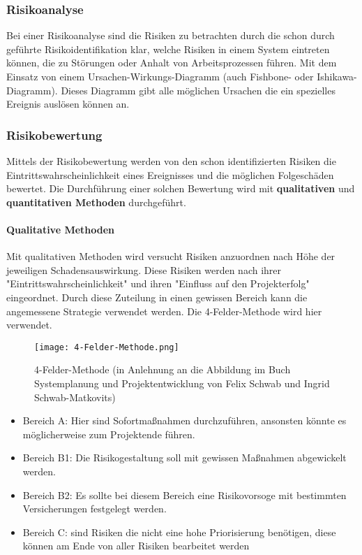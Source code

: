 \subsubsection{Risikoanalyse}
Bei einer Risikoanalyse sind die Risiken zu betrachten durch die schon durch geführte Risikoidentifikation klar, welche Risiken in einem System eintreten können, die zu Störungen oder Anhalt von Arbeitsprozessen führen. Mit dem Einsatz von einem Ursachen-Wirkungs-Diagramm (auch Fishbone- oder Ishikawa-Diagramm). Dieses Diagramm gibt alle möglichen Ursachen die ein spezielles Ereignis auslösen können an.

\subsubsection{Risikobewertung}
Mittels der Risikobewertung werden von den schon identifizierten Risiken die Eintrittswahrscheinlichkeit eines Ereignisses und die möglichen Folgeschäden bewertet. Die Durchführung einer solchen Bewertung wird mit \textbf{qualitativen} und \textbf{quantitativen Methoden} durchgeführt.

\paragraph{Qualitative Methoden}
Mit qualitativen Methoden wird versucht Risiken anzuordnen nach Höhe der jeweiligen Schadensauswirkung.
Diese Risiken werden nach ihrer "Eintrittswahrscheinlichkeit" und ihren "Einfluss auf den Projekterfolg" eingeordnet. Durch diese Zuteilung in einen gewissen Bereich kann die angemessene Strategie verwendet werden. Die 4-Felder-Methode wird hier verwendet.

\begin{center}
\begin{figure}[h]
    \centering
    \texttt{[image: 4-Felder-Methode.png]}
    \caption{4-Felder-Methode (in Anlehnung an die Abbildung im Buch Systemplanung und Projektentwicklung von Felix Schwab und Ingrid Schwab-Matkovits)}
\end{figure}
\end{center}

\begin{itemize}
	\item Bereich A: Hier sind Sofortmaßnahmen durchzuführen, ansonsten könnte es möglicherweise zum Projektende führen.
	\item Bereich B1: Die Risikogestaltung soll mit gewissen Maßnahmen abgewickelt werden.
	\item Bereich B2: Es sollte bei diesem Bereich eine Risikovorsoge mit bestimmten Versicherungen festgelegt werden.
	\item Bereich C: sind Risiken die nicht eine hohe Priorisierung benötigen, diese können am Ende von aller Risiken bearbeitet werden
\end{itemize}

